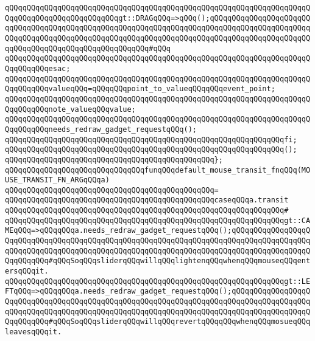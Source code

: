 \verb|qQQqqQQqqQQqqQQqqQQqqQQqqQQqqQQqqQQqqQQqqQQqqQQqqQQqqQQqqQQqqQQqqQQqqQQqqQQqqQQqqQQqqQQqqQQqqQQqgt::DRAGqQQq=>qQQq();qQQqqQQqqQQqqQQqqQQqqQQqqQQqqQQqqQQqqQQqqQQqqQQqqQQqqQQqqQQqqQQqqQQqqQQqqQQqqQQqqQQqqQQqqQQqqQQqqQQqqQQqqQQqqQQqqQQqqQQqqQQqqQQqqQQqqQQqqQQqqQQqqQQqqQQqqQQqqQQqqQQqqQQqqQQqqQQqqQQqqQQqqQQqqQQqqQQq#qQQq|\newline
\verb|qQQqqQQqqQQqqQQqqQQqqQQqqQQqqQQqqQQqqQQqqQQqqQQqqQQqqQQqqQQqqQQqqQQqqQQqqQQqqQQqesac;|\newline
\newline
\verb|qQQqqQQqqQQqqQQqqQQqqQQqqQQqqQQqqQQqqQQqqQQqqQQqqQQqqQQqqQQqqQQqqQQqqQQqqQQqqQQqvalueqQQq=qQQqqQQqpoint_to_valueqQQqqQQqevent_point;|\newline
\newline
\verb|qQQqqQQqqQQqqQQqqQQqqQQqqQQqqQQqqQQqqQQqqQQqqQQqqQQqqQQqqQQqqQQqqQQqqQQqqQQqqQQqnote_valueqQQqvalue;|\newline
\verb|qQQqqQQqqQQqqQQqqQQqqQQqqQQqqQQqqQQqqQQqqQQqqQQqqQQqqQQqqQQqqQQqqQQqqQQqqQQqqQQqneeds_redraw_gadget_requestqQQq();|\newline
\verb|qQQqqQQqqQQqqQQqqQQqqQQqqQQqqQQqqQQqqQQqqQQqqQQqqQQqqQQqqQQqqQQqfi;|\newline
\newline
\verb|qQQqqQQqqQQqqQQqqQQqqQQqqQQqqQQqqQQqqQQqqQQqqQQqqQQqqQQqqQQqqQQq();|\newline
\verb|qQQqqQQqqQQqqQQqqQQqqQQqqQQqqQQqqQQqqQQqqQQqqQQq};|\newline
\newline
\verb|qQQqqQQqqQQqqQQqqQQqqQQqqQQqqQQqfunqQQqdefault_mouse_transit_fnqQQq(MOUSE_TRANSIT_FN_ARGqQQqa)|\newline
\verb|qQQqqQQqqQQqqQQqqQQqqQQqqQQqqQQqqQQqqQQqqQQqqQQq=|\newline
\verb|qQQqqQQqqQQqqQQqqQQqqQQqqQQqqQQqqQQqqQQqqQQqqQQqcaseqQQqa.transit|\newline
\verb|qQQqqQQqqQQqqQQqqQQqqQQqqQQqqQQqqQQqqQQqqQQqqQQqqQQqqQQqqQQqqQQq#|\newline
\verb|qQQqqQQqqQQqqQQqqQQqqQQqqQQqqQQqqQQqqQQqqQQqqQQqqQQqqQQqqQQqqQQqgt::CAMEqQQq=>qQQqqQQqa.needs_redraw_gadget_requestqQQq();qQQqqQQqqQQqqQQqqQQqqQQqqQQqqQQqqQQqqQQqqQQqqQQqqQQqqQQqqQQqqQQqqQQqqQQqqQQqqQQqqQQqqQQqqQQqqQQqqQQqqQQqqQQqqQQqqQQqqQQqqQQqqQQqqQQqqQQqqQQqqQQqqQQqqQQqqQQqqQQqqQQqqQQq#qQQqSoqQQqsliderqQQqwillqQQqlightenqQQqwhenqQQqmouseqQQqentersqQQqit.|\newline
\verb|qQQqqQQqqQQqqQQqqQQqqQQqqQQqqQQqqQQqqQQqqQQqqQQqqQQqqQQqqQQqqQQqgt::LEFTqQQq=>qQQqqQQqa.needs_redraw_gadget_requestqQQq();qQQqqQQqqQQqqQQqqQQqqQQqqQQqqQQqqQQqqQQqqQQqqQQqqQQqqQQqqQQqqQQqqQQqqQQqqQQqqQQqqQQqqQQqqQQqqQQqqQQqqQQqqQQqqQQqqQQqqQQqqQQqqQQqqQQqqQQqqQQqqQQqqQQqqQQqqQQqqQQqqQQqqQQq#qQQqSoqQQqsliderqQQqwillqQQqrevertqQQqqQQqwhenqQQqmosueqQQqleavesqQQqit.|\newline
